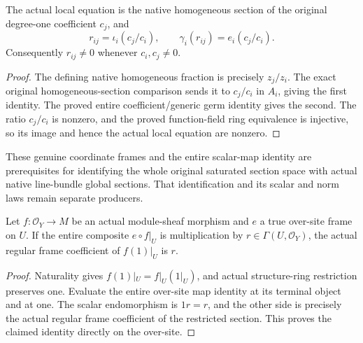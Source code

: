 \begin{theorem}
\label{thm:seven-native-original-coordinate-equation}
\leanok
The actual local equation is the native homogeneous section of the
original degree-one coefficient $c_j$, and
\[
 r_{ij}=\iota_i(c_j/c_i),\qquad
 \gamma_i(r_{ij})=e_i(c_j/c_i).
\]
Consequently $r_{ij}\ne0$ whenever $c_i,c_j\ne0$.
\end{theorem}
\begin{proof}
The defining native homogeneous fraction is precisely $z_j/z_i$.
The exact original homogeneous-section comparison sends it to $c_j/c_i$
in $A_i$, giving the first identity. The proved entire coefficient/generic
germ identity gives the second. The ratio $c_j/c_i$ is nonzero, and the
proved function-field ring equivalence is injective, so its image and
hence the actual local equation are nonzero.
\end{proof}

\begin{remark}
These genuine coordinate frames and the entire scalar-map identity are
prerequisites for identifying the whole original saturated section space
with actual native line-bundle global sections. That identification and
its scalar and norm laws remain separate producers.
\end{remark}


\begin{lemma}
\label{lem:seven-native-direct-unit-coefficient}
\leanok
Let $f:\mathcal O_Y\to M$ be an actual module-sheaf morphism and $e$ a
true over-site frame on $U$. If the entire composite $e\circ f|_U$ is
multiplication by $r\in\Gamma(U,\mathcal O_Y)$, the actual regular frame
coefficient of $f(1)|_U$ is $r$.
\end{lemma}
\begin{proof}
Naturality gives $f(1)|_U=f|_U(1|_U)$, and actual structure-ring restriction
preserves one. Evaluate the entire over-site map identity at its terminal
object and at one. The scalar endomorphism is $1r=r$, and the other side
is precisely the actual regular frame coefficient of the restricted
section. This proves the claimed identity directly on the over-site.
\end{proof}

